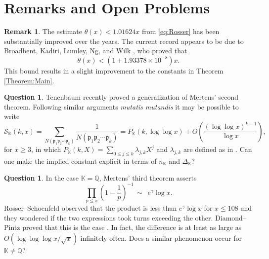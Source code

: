 \documentclass[10pt,reqno]{amsart}
\theoremstyle{plain}
\theoremstyle{definition}
\newtheorem{question}[theorem]{Question}
\newtheorem{remark}[theorem]{Remark}
\newcommand{\Q}{\mathbb{Q}}
\newcommand{\K}{\mathbb{K}}
\newcommand{\PP}{\mathfrak{p}}
\begin{document}
\section{Remarks and Open Problems}\label{Section:Future}

\begin{remark}\label{Remark:Theta}
The estimate $\theta(x) < 1.01624x$ from \eqref{eq:Rosser} has been substantially improved over the years.
The current record appears to be due to Broadbent, Kadiri, Lumley, Ng, and Wilk \cite{Broadbent}, who proved that 
\begin{equation*}
\theta(x) < (1+1.93378 \times 10^{-8})x.
\end{equation*}
This bound results in a slight improvement to the constants in
Theorem \ref{Theorem:Main}.
\end{remark}


\begin{question}
Tenenbaum \cite{Tenenbaum} recently proved a generalization of Mertens' second theorem.
Following similar arguments \textit{mutatis mutandis} it may be possible to write
\begin{equation*}
    \mathcal{S}_{\K}(k,x) = \sum_{N(\PP_1\PP_2\cdots\PP_k)}\frac{1}{N(\PP_1\PP_2\cdots\PP_k)} = P_{\K}(k,\log\log{x}) + O\left(\frac{(\log\log{x})^{k-1}}{\log{x}}\right),
\end{equation*}
for $x\geq 3$, in which $P_{\K}(k,X) = \sum_{0\leq j\leq k} \lambda_{j,k} X^j$ and $\lambda_{j,k}$ are defined as in \cite[Thm.~1]{Tenenbaum}.
Can one make the implied constant explicit in terms of $n_{\K}$ and $\Delta_{\K}$?
\end{question}


\begin{question}
In the case $\K = \Q$, Mertens' third theorem asserts
\begin{equation*}
    \prod_{p\leq x} \left(1 - \frac{1}{p}\right)^{-1} \,\sim\,\,\,e^\gamma \log{x} .
\end{equation*}
Rosser--Schoenfeld \cite{Rosser} observed that the product is less than $e^\gamma \log{x}$ for $x\leq 108$ and
they wondered if the two expressions took turns exceeding the other.
Diamond--Pintz proved that this is the case \cite{DiamondPintz}. In fact, the difference 
is at least as large as $O(\log\log\log{x}/\sqrt{x})$ infinitely often.
Does a similar phenomenon occur for $\K \neq \Q$?
\end{question}





\end{document}
